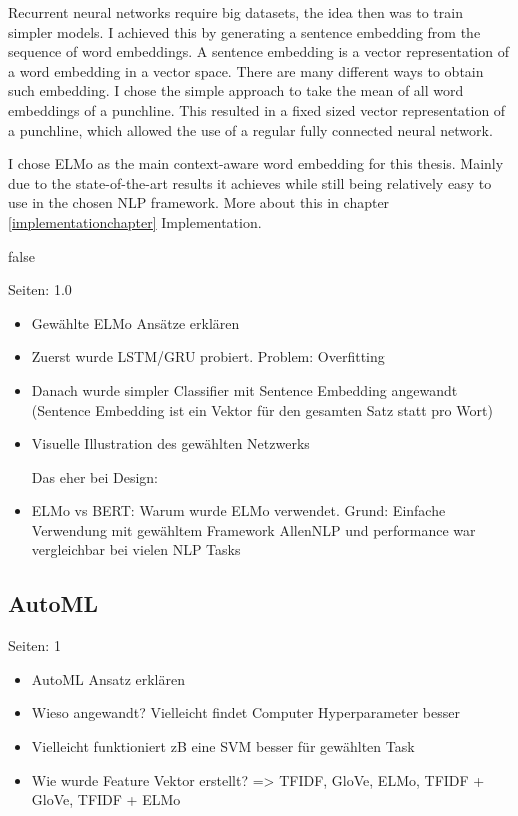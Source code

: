 \documentclass[draft,final,oneside]{vutinfth} %
\begin{document}
Recurrent neural networks require big datasets, the idea then was to train simpler models. I achieved this by generating a sentence embedding from the sequence of word embeddings. A sentence embedding is a vector representation of a word embedding in a vector space. There are many different ways to obtain such embedding. I chose the simple approach to take the mean of all word embeddings of a punchline. This resulted in a fixed sized vector representation of a punchline, which allowed the use of a regular fully connected neural network.

I chose ELMo as the main context-aware word embedding for this thesis. \cite{elmo} Mainly due to the state-of-the-art results it achieves while still being relatively easy to use in the chosen NLP framework. More about this in chapter \ref{implementationchapter} Implementation.


\if false

Seiten: 1.0

\begin{itemize}
\item Gewählte ELMo Ansätze erklären
\item Zuerst wurde LSTM/GRU probiert. Problem: Overfitting
\item Danach wurde simpler Classifier mit Sentence Embedding angewandt (Sentence Embedding ist ein Vektor für den gesamten Satz statt pro Wort)
\item Visuelle Illustration des gewählten Netzwerks

Das eher bei Design:
\item ELMo vs BERT: Warum wurde ELMo verwendet. Grund: Einfache Verwendung mit gewähltem Framework AllenNLP und performance war vergleichbar bei vielen NLP Tasks
\end{itemize}
\fi

\subsection{AutoML}

Seiten: 1

\begin{itemize}
\item AutoML Ansatz erklären
\item Wieso angewandt? Vielleicht findet Computer Hyperparameter besser
\item Vielleicht funktioniert zB eine SVM besser für gewählten Task
\item Wie wurde Feature Vektor erstellt? => TFIDF, GloVe, ELMo, TFIDF + GloVe, TFIDF + ELMo
\end{itemize}
\end{document}
